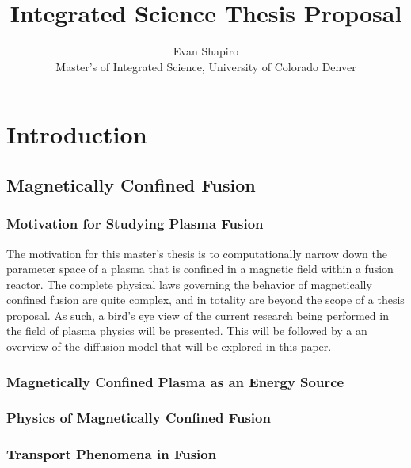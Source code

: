 \documentclass{article}
\title{Integrated Science Thesis Proposal}
\author{Evan Shapiro \\ Master's of Integrated Science, University of Colorado Denver}
\begin{document}
\maketitle
\tableofcontents
\section{Introduction}
\subsection{Magnetically Confined Fusion}
\subsubsection{Motivation for Studying Plasma Fusion}
The motivation for this master's thesis is to computationally narrow down the parameter space of a plasma that is confined in a magnetic field within a fusion reactor.
The complete physical laws governing the behavior of magnetically confined fusion are quite complex, and in totality are beyond the scope of a thesis proposal. 
As such, a bird's eye view of the current research being performed in the field of plasma physics will be presented. 
This will be followed by a an overview of the diffusion model that will be explored in this paper.\\
\subsubsection{Magnetically Confined Plasma as an Energy Source}
\subsubsection{Physics of Magnetically Confined Fusion}
\subsubsection{Transport Phenomena in Fusion}
\
\end{document}
